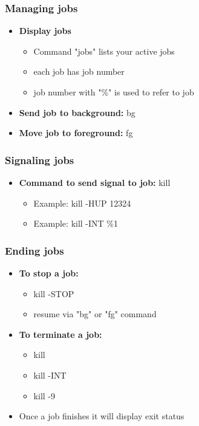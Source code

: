 \documentclass{report}
\begin{document}
    \bigbreak \noindent 
    \subsubsection{Managing jobs}
    \begin{itemize}
        \item \textbf{Display jobs}
            \begin{itemize}
                \item Command "jobs" lists your active jobs
                \item each job has job number
                \item job number with "\%" is used to refer to job
            \end{itemize}
        \item \textbf{Send job to background:} bg
        \item \textbf{Move job to foreground:} fg
    \end{itemize}

    \bigbreak \noindent 
    \subsubsection{Signaling jobs}
    \begin{itemize}
        \item \textbf{Command to send signal to job:} kill
            \begin{itemize}
                \item Example: kill -HUP 12324
                \item Example: kill -INT  \%1
            \end{itemize}
    \end{itemize}

    \bigbreak \noindent 
    \subsubsection{Ending jobs}
    \begin{itemize}
        \item \textbf{To stop a job:}
            \begin{itemize}
                \item kill -STOP
                \item resume via "bg" or "fg" command
            \end{itemize}
        \item \textbf{To terminate a job:}
            \begin{itemize}
                \item kill
                \item kill -INT
                \item kill -9
            \end{itemize}
        \item Once a job finishes it will display exit status
    \end{itemize}
\end{document}
